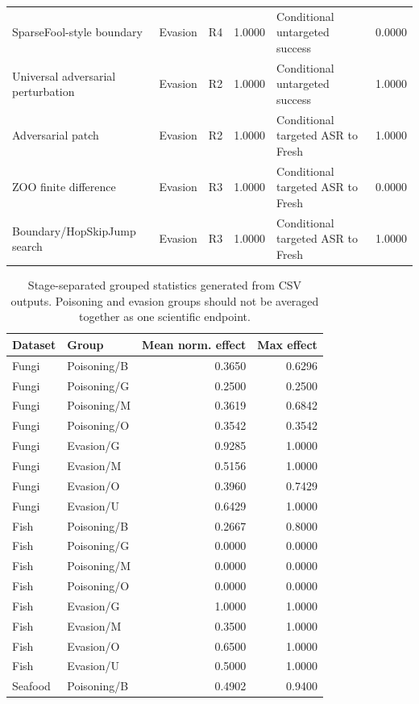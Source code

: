 \documentclass[conference]{IEEEtran}
\begin{document}
\begin{table}[t]
\begin{tabular}{p{}p{}p{}p{}p{}p{}}
SparseFool-style boundary & Evasion & R4 & 1.0000 & Conditional untargeted success & 0.0000 \\
Universal adversarial perturbation & Evasion & R2 & 1.0000 & Conditional untargeted success & 1.0000 \\
Adversarial patch & Evasion & R2 & 1.0000 & Conditional targeted ASR to Fresh & 1.0000 \\
ZOO finite difference & Evasion & R3 & 1.0000 & Conditional targeted ASR to Fresh & 0.0000 \\
Boundary/HopSkipJump search & Evasion & R3 & 1.0000 & Conditional targeted ASR to Fresh & 1.0000 \\
\bottomrule
\end{tabular}
\end{table}

\begin{table}[t]
\centering
\caption{Stage-separated grouped statistics generated from CSV outputs. Poisoning and evasion groups should not be averaged together as one scientific endpoint.}
\label{tab:groupstats}
\small
\begin{tabular}{llrr}
\toprule
Dataset & Group & Mean norm. effect & Max effect \\
\midrule
Fungi & Poisoning/B & 0.3650 & 0.6296 \\
Fungi & Poisoning/G & 0.2500 & 0.2500 \\
Fungi & Poisoning/M & 0.3619 & 0.6842 \\
Fungi & Poisoning/O & 0.3542 & 0.3542 \\
Fungi & Evasion/G & 0.9285 & 1.0000 \\
Fungi & Evasion/M & 0.5156 & 1.0000 \\
Fungi & Evasion/O & 0.3960 & 0.7429 \\
Fungi & Evasion/U & 0.6429 & 1.0000 \\
Fish & Poisoning/B & 0.2667 & 0.8000 \\
Fish & Poisoning/G & 0.0000 & 0.0000 \\
Fish & Poisoning/M & 0.0000 & 0.0000 \\
Fish & Poisoning/O & 0.0000 & 0.0000 \\
Fish & Evasion/G & 1.0000 & 1.0000 \\
Fish & Evasion/M & 0.3500 & 1.0000 \\
Fish & Evasion/O & 0.6500 & 1.0000 \\
Fish & Evasion/U & 0.5000 & 1.0000 \\
Seafood & Poisoning/B & 0.4902 & 0.9400 \\

\end{tabular}
\end{table}
\end{document}
